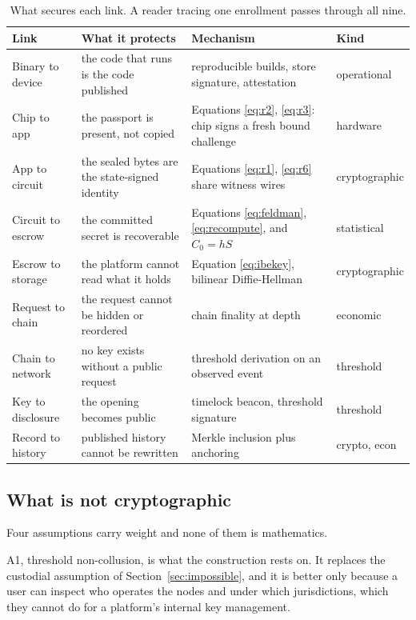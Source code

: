 \documentclass[11pt,a4paper]{article}
\begin{document}
\begin{table}[h]
\centering
\small
\begin{tabular}{p{2.15cm}p{3.9cm}p{4.5cm}p{2.1cm}}
\toprule
Link & What it protects & Mechanism & Kind \\
\midrule
Binary to device &
  the code that runs is the code published &
  reproducible builds, store signature, attestation &
  operational \\
Chip to app &
  the passport is present, not copied &
  Equations \ref{eq:r2}, \ref{eq:r3}: chip signs a fresh bound challenge &
  hardware \\
App to circuit &
  the sealed bytes are the state-signed identity &
  Equations \ref{eq:r1}, \ref{eq:r6} share witness wires &
  cryptographic \\
Circuit to escrow &
  the committed secret is recoverable &
  Equations \ref{eq:feldman}, \ref{eq:recompute}, and $C_0 = hS$ &
  statistical \\
Escrow to storage &
  the platform cannot read what it holds &
  Equation \ref{eq:ibekey}, bilinear Diffie-Hellman &
  cryptographic \\
Request to chain &
  the request cannot be hidden or reordered &
  chain finality at depth &
  economic \\
Chain to network &
  no key exists without a public request &
  threshold derivation on an observed event &
  threshold \\
Key to disclosure &
  the opening becomes public &
  timelock beacon, threshold signature &
  threshold \\
Record to history &
  published history cannot be rewritten &
  Merkle inclusion plus anchoring &
  crypto, econ \\
\bottomrule
\end{tabular}
\caption{What secures each link. A reader tracing one enrollment passes through
all nine.}
\label{tab:trust}
\end{table}

\subsection{What is not cryptographic}
\label{sec:notcrypto}

Four assumptions carry weight and none of them is mathematics.

A1, threshold non-collusion, is what the construction rests on. It replaces the
custodial assumption of Section~\ref{sec:impossible}, and it is better only
because a user can inspect who operates the nodes and under which jurisdictions,
which they cannot do for a platform's internal key management.
\end{document}
